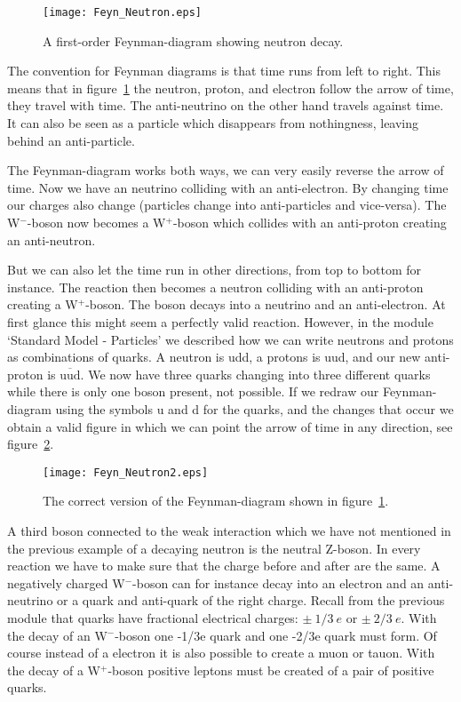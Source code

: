\begin{figure}\begin{center}
\texttt{[image: Feyn\_Neutron.eps]}%
\caption{A first-order Feynman-diagram showing neutron decay.}\label{fig:Feyn_Neutron}
\end{center}\end{figure}

The convention for Feynman diagrams is that time runs from left to right. This means that in figure~\ref{fig:Feyn_Neutron} the neutron, proton, and electron follow the arrow of time, they travel with time. The anti-neutrino on the other hand travels against time. It can also be seen as a particle which disappears from nothingness, leaving behind an anti-particle.

The Feynman-diagram works both ways, we can very easily reverse the arrow of time. Now we have an neutrino colliding with an anti-electron. By changing time our charges also change (particles change into anti-particles and vice-versa). The W$^-$-boson now becomes a W$^+$-boson which collides with an anti-proton creating an anti-neutron.

But we can also let the time run in other directions, from top to bottom for instance. The reaction then becomes a neutron colliding with an anti-proton creating a W$^+$-boson. The boson decays into a neutrino and an anti-electron. At first glance this might seem a perfectly valid reaction. However, in the module `Standard Model - Particles' we described how we can write neutrons and protons as combinations of quarks. A neutron is udd, a protons is uud, and our new anti-proton is $\overline{\mbox{uud}}$. We now have three quarks changing into three different quarks while there is only one boson present, not possible. If we redraw our Feynman-diagram using the symbols u and d for the quarks, and the changes that occur we obtain a valid figure in which we can point the arrow of time in any direction, see figure~\ref{fig:Feyn_Neutron2}.

\begin{figure}\begin{center}
\texttt{[image: Feyn\_Neutron2.eps]}%
\caption{The correct version of the Feynman-diagram shown in figure~\ref{fig:Feyn_Neutron}.}\label{fig:Feyn_Neutron2}
\end{center}\end{figure}

A third boson connected to the weak interaction which we have not mentioned in the previous example of a decaying neutron is the neutral Z-boson. In every reaction we have to make sure that the charge before and after are the same. A negatively charged W$^-$-boson can for instance decay into an electron and an anti-neutrino or a quark and anti-quark of the right charge. Recall from the previous module that quarks have fractional electrical charges: $\pm~1/3~e$ or $\pm~2/3~e$. With the decay of an W$^-$-boson one -1/3e quark and one -2/3e quark must form. Of course instead of a electron it is also possible to create a muon or tauon. With the decay of a W$^+$-boson positive leptons must be created of a pair of positive quarks.


